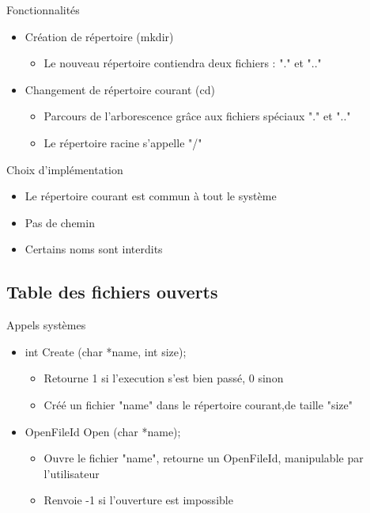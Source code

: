 \documentclass{beamer}
\begin{document}
\begin{frame}
  \begin{block}{Fonctionnalités}
  	\begin{itemize}[<+->]
  		\item Création de répertoire (mkdir)
  		\begin{itemize}
  			\item<1-> Le nouveau répertoire contiendra deux fichiers : "." et ".."
  		\end{itemize}
  		\item<2-> Changement de répertoire courant (cd)
  		\begin{itemize}
  			\item<3-> Parcours de l'arborescence grâce aux fichiers spéciaux "." et ".."
  			\item<4-> Le répertoire racine s'appelle "/"
  		\end{itemize}
  	\end{itemize}
  \end{block}
  \begin{block}{Choix d'implémentation}
  	  \begin{itemize}
  	  	  \item<5-> Le répertoire courant est commun à tout le système
  	  	  \item<6-> Pas de chemin
  	  	  \item<7-> Certains noms sont interdits
  	  \end{itemize}
  \end{block}
\end{frame}

\subsection{Table des fichiers ouverts}
\begin{frame}
	\begin{block}{Appels systèmes}
		\begin{itemize}
			\item<1-> int Create (char *name, int size);
			\begin{itemize}
				\item<1->Retourne 1 si l'execution s'est bien passé, 0 sinon
				\item<1->Créé un fichier "name" dans le répertoire courant,de taille "size"
			\end{itemize}
			\item<2-> OpenFileId Open (char *name);
			\begin{itemize}
				\item<1->Ouvre le fichier "name", retourne un OpenFileId, manipulable par l'utilisateur
				\item<1->Renvoie -1 si l'ouverture est impossible
			\end{itemize}			
		\end{itemize}
	\end{block}
\end{frame}
\end{document}
